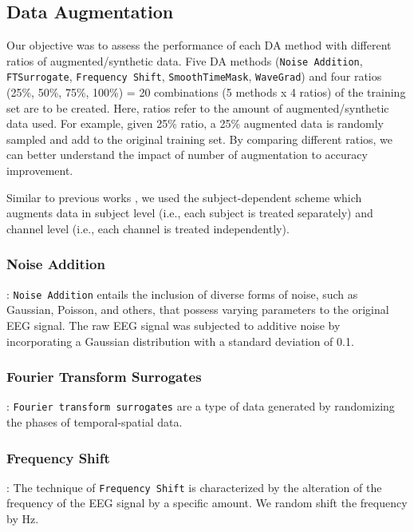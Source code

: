 \documentclass[12pt]{iopart}
\begin{document}
\subsection{Data Augmentation}
Our objective was to assess the performance of each DA method with different ratios of augmented/synthetic data. Five DA methods (\texttt{Noise Addition}, \texttt{FTSurrogate}, \texttt{Frequency Shift}, \texttt{SmoothTimeMask}, \texttt{WaveGrad}) and four ratios (25\%, 50\%, 75\%, 100\%) = 20 combinations (5 methods x 4 ratios) of the training set are to be created.  Here, ratios refer to the amount of augmented/synthetic data used.  For example, given 25\% ratio, a 25\% augmented data is randomly sampled and add to the original training set.  By comparing different ratios, we can better understand the impact of number of augmentation to accuracy improvement.

\begin{sloppypar}
Similar to previous works \cite{rommel2021cadda,mohsenvand2020contrastive,leeb2008bci,terzano2001atlas}, we used the subject-dependent scheme which augments data in subject level (i.e., each subject is treated separately) and channel level (i.e., each channel is treated independently).
\end{sloppypar}

\subsubsection{Noise Addition}: \texttt{Noise Addition} entails the inclusion of diverse forms of noise, such as Gaussian, Poisson, and others, that possess varying parameters to the original EEG signal. The raw EEG signal was subjected to additive noise by incorporating a Gaussian distribution with a standard deviation of 0.1. 

\subsubsection{Fourier Transform Surrogates}:
\texttt{Fourier transform surrogates} are a type of data generated by randomizing the phases of temporal-spatial data.


\subsubsection{Frequency Shift}: The technique of \texttt{Frequency Shift} is characterized by the alteration of the frequency of the EEG signal by a specific amount.
We random shift the frequency by  Hz.
\end{document}
